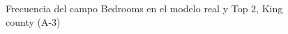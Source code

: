 \begin{figure}[H]
    \centering
    
    \caption{Frecuencia del campo Bedrooms en el modelo real y Top 2, King county (A-3)}
    \label{frecuency-top2-bedrooms}
\end{figure}